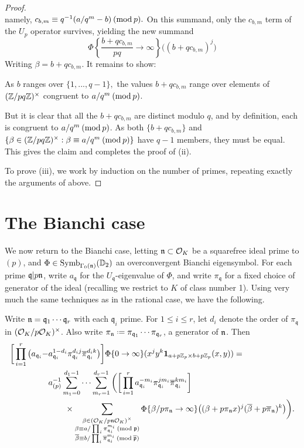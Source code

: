\documentclass[a4paper,11pt]{article}
\newcommand{\q}{\mathfrak{q}}
\newcommand{\pibar}{\overline{\pi}}
\numberwithin{equation}{section}
\begin{document}
\begin{proof}
\[\]
namely, $c_{b,m} \equiv q^{-1}(a/q^m - b) \hspace{2pt}(\mathrm{mod}\hspace{2pt}p).$ On this summand, only the $c_{b,m}$ term of the $U_p$ operator survives, yielding the new summand
\[
 \Phi\left\{\frac{b+qc_{b,m}}{pq}\rightarrow\infty\right\}\big((b+qc_{b,m})^j\big)
\]
Writing $\beta = b+qc_{b,m}$. It remains to show:
\begin{claim}
As $b$ ranges over $\{1,...,q-1\},$ the values $b+qc_{b,m}$ range over elements of $(\mathbb{Z}/pq\mathbb{Z})^\times$ congruent to $a/q^m \hspace{2pt}(\mathrm{mod}\hspace{2pt}p)$.
\end{claim}
But it is clear that all the $b + qc_{b,m}$ are distinct modulo $q$, and by definition, each is congruent to $a/q^m \hspace{2pt}(\mathrm{mod}\hspace{2pt}p)$. As both $\{b+qc_{b,m}\}$ and $\{\beta \in (\mathbb{Z}/pq\mathbb{Z})^\times: \beta \equiv a/q^m \hspace{2pt}(\mathrm{mod}\hspace{2pt}p)\}$ have $q-1$ members, they must be equal. This gives the claim and completes the proof of (ii).

To prove (iii), we work by induction on the number of primes, repeating exactly the arguments of above.
\end{proof}


\section{The Bianchi case}
We now return to the Bianchi case, letting $\mathfrak{n}\subset \mathcal{O}_K$ be a squarefree ideal prime to $(p)$, and $\Phi \in \mathrm{Symb}_{\Gamma_0(\mathfrak{n})}(\mathbb{D}_2)$ an overconvergent Bianchi eigensymbol. For each prime $\q|p\n$, write $a_{\q}$ for the $U_{\q}$-eigenvalue of $\Phi$, and write $\pi_{\q}$ for a fixed choice of generator of the ideal (recalling we restrict to $K$ of class number 1). Using very much the same techniques as in the rational case, we have the following.

\begin{proposition}
Write $\n = \q_1\cdots\q_r$ with each $\q_i$ prime. For $1 \leq i \leq r$, let $d_{i}$ denote the order of $\pi_{\q}$ in $(\mathcal{O}_K/p\mathcal{O}_K)^\times$. Also write $\pi_{\n} \defeq \pi_{\q_1}\cdots\pi_{\q_r}$, a generator of $\mathfrak{n}$. Then 
\begin{align*}
	\bigg[\prod_{i=1}^r\big(a_{\q_i} - &a_{\q_i}^{1-d_i}\pi_{\q_i}^{d_ij}\pibar_{\q_i}^{d_ik}\big)\bigg]\Phi\{0\rightarrow\infty\}(x^jy^k \mathbf{1}_{a+p\Zp \times b+p\Zp}(x,y)) =
\\
&a_{(p)}^{-1} \sum_{m_1 = 0}^{d_1-1} \cdots \sum_{m_r = 1}^{d_r - 1} \bigg(\bigg[\prod_{i=1}^ra_{\q_i}^{-m_i}\pi_{\q_i}^{jm_i}\pibar_{\q_i}^{km_i}\bigg]\\%
&\hspace{20pt}\times\sum_{\substack{\beta \in (\roi_K/p\n\roi_K)^\times\\ \beta \equiv a/\prod_i\pi_{\q_i}^{m_i} \newmod{\pri}\\
\overline{\beta} \equiv b/\prod_i\pibar_{\q_i}^{m_i} \newmod{\pribar}}} \Phi\{\beta/p\pi_{\n}\rightarrow \infty\}\big((\beta + p\pi_{\n}x)^j(\overline{\beta} + p\pibar_{\n})^k\big)\bigg).
\end{align*}

\end{proposition}



\footnotesize
\renewcommand{\refname}{\normalsize References} 
{}


\Addresses
\end{document}
